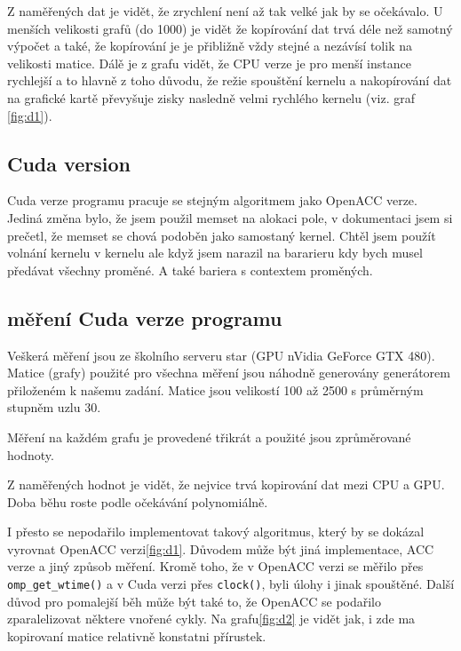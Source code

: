 \documentclass[11pt, fleqn]{article}
\begin{document}
Z naměřených dat je vidět, že zrychlení není až tak velké jak by se očekávalo. U menších velikosti grafů (do 1000) je vidět že kopírování dat trvá déle než samotný výpočet a také, že kopírování je je přibližně vždy stejné a nezávísí tolik na velikosti matice. Dálě je z grafu vidět, že CPU verze je pro menší instance rychlejší a to hlavně z toho důvodu, že režie spouštění kernelu a nakopírování dat na grafické kartě převyšuje zisky nasledně velmi rychlého kernelu (viz. graf \ref{fig:d1}).


\subsection{Cuda version}

Cuda verze programu pracuje se stejným algoritmem jako OpenACC verze. Jediná změna bylo, že jsem použil memset na alokaci pole, v dokumentaci jsem si prečetl, že memset se chová podoběn jako samostaný kernel. Chtěl jsem použít volnání kernelu v kernelu ale když jsem narazil na bararieru kdy bych musel předávat všechny proměné. A také bariera s contextem proměných.

\subsection{měření Cuda verze programu}

Veškerá měření jsou ze školního serveru star (GPU nVidia GeForce GTX 480). Matice (grafy) použité pro všechna měření jsou náhodně generovány generátorem přiloženém k našemu zadání. Matice jsou velikostí 100 až 2500 s průměrným stupněm uzlu 30.

Měření na každém grafu je provedené třikrát a použité jsou zprůměrované hodnoty.

Z naměřených hodnot je vidět, že nejvice trvá kopirování dat mezi CPU a GPU. Doba běhu roste podle očekávání polynomiálně.

I přesto se nepodařilo implementovat takový algoritmus, který by se dokázal vyrovnat OpenACC verzi\ref{fig:d1}. Důvodem může být jiná implementace, ACC verze a jiný způsob měření. Kromě toho, že v OpenACC verzi se měřilo přes \lstinline{omp_get_wtime()} a v Cuda verzi přes \lstinline{clock()}, byli úlohy i jinak spouštěné. Další důvod pro pomalejší běh může být také to, že OpenACC se podařilo zparalelizovat některe vnořené cykly. Na grafu\ref{fig:d2} je vidět jak, i zde ma kopirovaní matice relativně konstatni přírustek.
\end{document}
